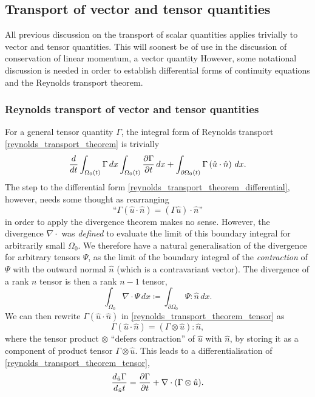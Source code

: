 \subsection{Transport of vector and tensor quantities}
All previous discussion on the transport of scalar quantities applies trivially to vector and tensor quantities.
This will soonest be of use in the discussion of conservation of linear momentum, a vector quantity
However, some notational discussion is needed in order to establish differential forms of continuity equations and the Reynolds transport theorem.
\subsubsection{Reynolds transport of vector and tensor quantities}
For a general tensor quantity $\Gamma$, the integral form of Reynolds transport \eqref{reynolds_transport_theorem} is trivially
\begin{equation}\label{reynolds_transport_theorem_tensor}
    \frac{d}{dt}\int_{\Omega_0(t)}\Gamma\,dx
        \int_{\Omega_0(t)}\frac{\partial \Gamma}{\partial t}\,dx + \int_{\partial\Omega_0(t)}\Gamma \left(\hat{u}\cdot\hat{n}\right) \,dx.
\end{equation}
The step to the differential form \eqref{reynolds_transport_theorem_differential}, however, needs some thought
as rearranging
    $$\text{``}\Gamma\left(\hat{u}\cdot \hat{n}\right) = (\Gamma\hat{u})\cdot \hat{n}\text{''}$$
in order to apply the divergence theorem makes no sense. However, the divergence $\nabla \cdot$ was \textit{defined}
to evaluate the limit of this boundary integral for arbitrarily small $\Omega_0$. We therefore have a natural generalisation of the
divergence for arbitrary tensors $\Psi$, as the limit of the boundary integral of the \textit{contraction} of $\Psi$ with the outward normal
$\hat{n}$ (which is a contravariant vector). The divergence of a rank $n$ tensor is then a rank $n-1$ tensor,
\begin{equation}\label{tensor_divergence}
    \int_{\Omega_0} \nabla\cdot\Psi\,dx \coloneqq
        \int_{\partial{\Omega_0}} \Psi : \hat{n}\,dx.
\end{equation}
We can then rewrite $\Gamma \left(\hat{u}\cdot \hat{n}\right)$ in \eqref{reynolds_transport_theorem_tensor} as
    $$\Gamma \left(\hat{u}\cdot \hat{n}\right) = \left(\Gamma \otimes \hat{u}\right) : \hat{n},$$
where the tensor product $\otimes$ ``defers contraction'' of $\hat{u}$ with $\hat{n}$, by storing it as a component of product tensor $\Gamma \otimes \hat{u}$.
This leads to a differentialisation of \eqref{reynolds_transport_theorem_tensor},
\begin{equation}\label{reynolds_transport_theorem_tensor_differential}
    \frac{d_{\hat{u}}\Gamma}{d_{\hat{u}}t} = \frac{\partial \Gamma}{\partial t} + \nabla \cdot(\Gamma \otimes \hat{u}).
\end{equation}
